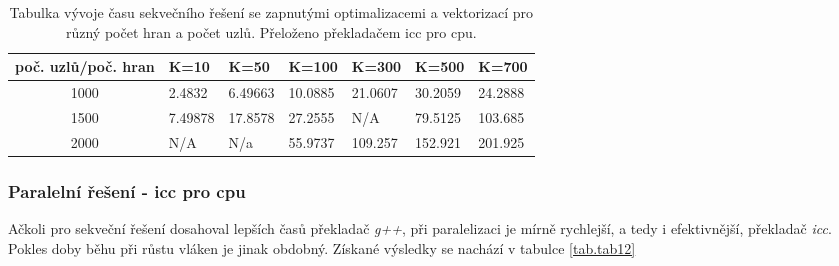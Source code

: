 \documentclass[a4paper,11pt]{article}
\begin{document}
    
    \begin{table}[ht]
  \begin{center}
   \begin{tabular}{|c|l|l|l|l|l|l|}
    \hline 
    poč. uzlů/poč. hran & K=10 & K=50 & K=100 & K=300 & K=500 & K=700\\
   \hline 
   \hline 
   1000 & 2.4832 & 6.49663 & 10.0885 & 21.0607  & 30.2059 & 24.2888\\
   \hline
    1500 & 7.49878 & 17.8578 & 27.2555 & N/A & 79.5125 & 103.685\\
    \hline
    2000 & N/A & N/a & 55.9737 & 109.257 & 152.921 & 201.925\\
    \hline
    \end{tabular}
   \caption{Tabulka vývoje času sekvečního řešení se zapnutými optimalizacemi a vektorizací pro různý počet hran a počet uzlů. Přeloženo 
   překladačem icc pro cpu.} 
   \label{tab.tab9}
  \end{center}   
  \end{table}
  \clearpage
    \subsubsection{Paralelní řešení - icc pro cpu}
  Ačkoli pro sekveční řešení dosahoval lepších časů překladač \textit{g++}, při paralelizaci je mírně
  rychlejší, a tedy i efektivnější, překladač \textit{icc}. Pokles doby běhu při růstu vláken je
  jinak obdobný. Získané výsledky se nachází v tabulce \ref{tab.tab12}
    
\end{document}
